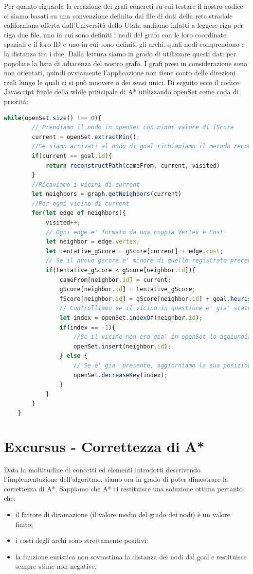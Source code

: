 \documentclass[12pt,a4paper]{report}
\begin{document}
Per quanto riguarda la creazione dei grafi concreti su cui testare il nostro codice ci siamo basati su una convenzione definita dai file di dati della rete stradale californiana offerta dall'Università dello Utah: andiamo infatti a leggere riga per riga due file, uno in cui sono definiti i nodi del grafo con le loro coordinate spaziali e il loro ID e uno in cui sono definiti gli archi, quali nodi comprendono e la distanza tra i due. Dalla lettura siamo in grado di utilizzare questi dati per popolare la lista di adiacenza del nostro grafo. I grafi presi in considerazione sono non orientati, quindi ovviamente l'applicazione non tiene conto delle direzioni reali lungo le quali ci si può muovere o dei sensi unici.
\newpage
Di seguito ecco il codice Javascript finale della while principale di A* utilizzando openSet come coda di priorità:
\\
\begin{lstlisting}[language=JavaScript]
	while(openSet.size() !== 0){
		// Prendiamo il nodo in openSet con minor valore di fScore
		current = openSet.extractMin();
		//Se siamo arrivati al nodo di goal richiamiamo il metodo reconstructPath
		if(current == goal.id){
			return reconstructPath(cameFrom, current, visited)
		} 
		//Ricaviamo i vicini di current
		let neighbors = graph.getNeighbors(current)
		//Per ogni vicino di current 
		for(let edge of neighbors){
			visited++;
			// Ogni edge e' formato da una coppia Vertex e Cost
			let neighbor = edge.vertex;
			let tentative_gScore = gScore[current] + edge.cost;
			// Se il nuovo gscore e' minore di quello registrato precedentemente, aggiorniamo i valori relativi
			if(tentative_gScore < gScore[neighbor.id]){
				cameFrom[neighbor.id] = current;
				gScore[neighbor.id] = tentative_gScore;
				fScore[neighbor.id] = gScore[neighbor.id] + goal.heuristic(neighbor);
				// Controlliamo se il vicino in questione e' gia' stato inserito in openSet
				let index = openSet.indexOf(neighbor.id);
				if(index == -1){
					//Se il vicino non era gia' in openSet lo aggiungiamo
					openSet.insert(neighbor.id);
				} else {
					// Se e' gia' presente, aggiorniamo la sua posizione nella coda
					openSet.decreaseKey(index);
				}
			}
		}
	}
\end{lstlisting}

\newpage
\section{Excursus - Correttezza di A*}
Data la moltitudine di concetti ed elementi introdotti descrivendo l'implementazione dell'algoritmo, siamo ora in grado di poter dimostrare la correttezza di A*.
Sappiamo che A* ci restituisce una soluzione ottima pertanto che:
\begin{itemize}
	\item il fattore di diramazione (il valore medio del grado dei nodi) è un valore finito;
	\item i costi degli archi sono strettamente positivi;
	\item la funzione euristica non sovrastima la distanza dei nodi dal goal e restituisce sempre stime non negative.
\end{itemize}
\end{document}

